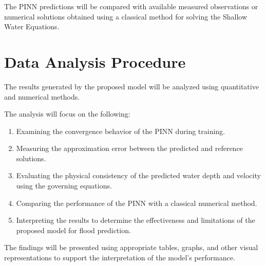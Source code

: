 The PINN predictions will be compared with available measured observations or numerical solutions obtained using a classical method for solving the Shallow Water Equations.

\section{Data Analysis Procedure}

The results generated by the proposed model will be analyzed using quantitative and numerical methods.

The analysis will focus on the following:

\begin{enumerate}
    \item Examining the convergence behavior of the PINN during training.
    
    \item Measuring the approximation error between the predicted and reference solutions.
    
    \item Evaluating the physical consistency of the predicted water depth and velocity using the governing equations.
    
    \item Comparing the performance of the PINN with a classical numerical method.
    
    \item Interpreting the results to determine the effectiveness and limitations of the proposed model for flood prediction.
\end{enumerate}

The findings will be presented using appropriate tables, graphs, and other visual representations to support the interpretation of the model's performance.
